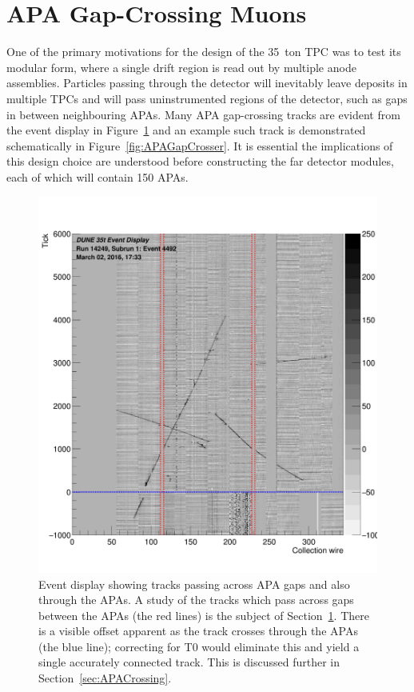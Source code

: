\section{APA Gap-Crossing Muons}\label{sec:APAGapCrossing}

One of the primary motivations for the design of the 35~ton TPC was to test its modular form, where a single drift region is read out by multiple anode assemblies.  Particles passing through the detector will inevitably leave deposits in multiple TPCs and will pass uninstrumented regions of the detector, such as gaps in between neighbouring APAs.  Many APA gap-crossing tracks are evident from the event display in Figure~\ref{fig:evd_crossing} and an example such track is demonstrated schematically in Figure~\ref{fig:APAGapCrosser}.  It is essential the implications of this design choice are understood before constructing the far detector modules, each of which will contain 150 APAs.

\begin{figure}
  \centering
  \includegraphics[width=12cm]{evd_run14249_subrun1_event4492.png}%
  \caption[Event display showing tracks passing across APA gaps and also through the APAs.]{Event display showing tracks passing across APA gaps and also through the APAs.  A study of the tracks which pass across gaps between the APAs (the red lines) is the subject of Section~\ref{sec:APAGapCrossing}.  There is a visible offset apparent as the track crosses through the APAs (the blue line); correcting for T0 would eliminate this and yield a single accurately connected track.  This is discussed further in Section~\ref{sec:APACrossing}.}
  \label{fig:evd_crossing}
\end{figure}


